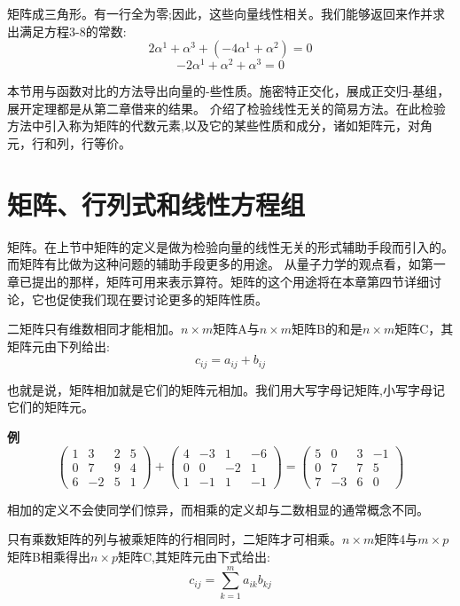 矩阵成三角形。有一行全为零;因此，这些向量线性相关。我们能够返回来作并求出满足方程3-8的常数:
\[2\alpha^1+\alpha^3+(-4\alpha^1+\alpha^2)=0\]
\[-2\alpha^1+\alpha^2+\alpha^3=0\]

本节用与函数对比的方法导出向量的-些性质。施密特正交化，展成正交归-基组，展开定理都是从第二章借来的结果。
介绍了检验线性无关的简易方法。在此检验方法中引入称为矩阵的代数元素,以及它的某些性质和成分，诸如矩阵元，对角元，行和列，行等价。

\section{矩阵、行列式和线性方程组}
矩阵。在上节中矩阵的定义是做为检验向量的线性无关的形式辅助手段而引入的。而矩阵有比做为这种问题的辅助手段更多的用途。
从量子力学的观点看，如第一章已提出的那样，矩阵可用来表示算符。矩阵的这个用途将在本章第四节详细讨论，它也促使我们现在要讨论更多的矩阵性质。

\begin{definition}[矩阵加法]
    二矩阵只有维数相同才能相加。$n \times m$矩阵A与$n \times m$矩阵B的和是$n \times m$矩阵C，其矩阵元由下列给出:
    \[c_{ij}=a_{ij}+b_{ij} \tag{3-14}\]
\end{definition}

也就是说，矩阵相加就是它们的矩阵元相加。我们用大写字母记矩阵,小写字母记它们的矩阵元。

\textbf{例}
\[
\begin{pmatrix}
    1 & 3 & 2 & 5 \\
    0 & 7 & 9 & 4 \\
    6 & -2 & 5 & 1 
\end{pmatrix}    
+
\begin{pmatrix}
    4 & -3 & 1 & -6 \\
    0 & 0 & -2 & 1 \\
    1 & -1 & 1 & -1 
\end{pmatrix}
=
\begin{pmatrix}
    5 & 0 & 3 & -1 \\
    0 & 7 & 7 & 5 \\
    7 & -3 & 6 & 0 
\end{pmatrix}   
\]

相加的定义不会使同学们惊异，而相乘的定义却与二数相显的通常概念不同。

\begin{definition}[矩阵乘法]
    只有乘数矩阵的列与被乘矩阵的行相同时，二矩阵才可相乘。$n \times m$矩阵4与$m \times p$矩阵B相乘得出$n \times p$矩阵C,其矩阵元由下式给出:
    \[c_{ij}=\sum_{k=1}^ma_{ik}b_{kj} \tag{3-15}\]
\end{definition}

